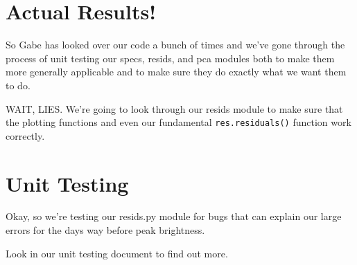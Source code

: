 \documentclass{article}
\begin{document}
\section{Actual Results!}
\label{forrealz}

So Gabe has looked over our code a bunch of times and we've gone
through the process of unit testing our specs, resids, and pca modules
both to make them more generally applicable and to make sure they do
exactly what we want them to do.

WAIT, LIES.  We're going to look through our resids module to make
sure that the plotting functions and even our fundamental
\verb|res.residuals()| function work correctly.

\section{Unit Testing}
\label{sec:testing}

Okay, so we're testing our resids.py module for bugs that can explain
our large errors for the days way before peak brightness.

Look in our unit testing document to find out more.
\end{document}

